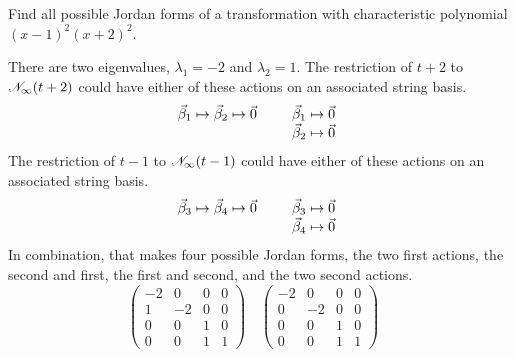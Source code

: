 \begin{exercises}
\begin{answer}
\begin{exparts}
\begin{equation*}
            \end{equation*}
      \end{exparts}  
    \end{answer}
  \recommended \item
    Find all possible Jordan forms of a transformation with characteristic
    polynomial \( (x-1)^2(x+2)^2  \).
    \begin{answer}
      There are two eigenvalues, $\lambda_1=-2$ and $\lambda_2=1$.
      The restriction of $t+2$ to 
      $\mathscr{N}_\infty(t+2)$ could have either of these actions 
      on an associated string basis.
      \begin{equation*}
        \vec{\beta}_1\mapsto\vec{\beta}_2\mapsto\vec{0}
        \qquad
        \begin{array}[t]{l}
          \vec{\beta}_1\mapsto\vec{0}  \\
          \vec{\beta}_2\mapsto\vec{0} 
        \end{array}
      \end{equation*}
      The restriction of $t-1$ to 
      $\mathscr{N}_\infty(t-1)$ could have either of these actions 
      on an associated string basis.
      \begin{equation*}
        \vec{\beta}_3\mapsto\vec{\beta}_4\mapsto\vec{0}
        \qquad
        \begin{array}[t]{l}
          \vec{\beta}_3\mapsto\vec{0}  \\
          \vec{\beta}_4\mapsto\vec{0} 
        \end{array}
      \end{equation*}
      In combination, that makes four possible Jordan forms,
      the two first actions, the second and first, the first and second, and
      the two second actions.
      \begin{equation*}
        \begin{pmatrix}
          -2  &0  &0  &0  \\
           1  &-2 &0  &0  \\
           0  &0  &1  &0  \\
           0  &0  &1  &1
        \end{pmatrix}
        \quad
        \begin{pmatrix}
          -2  &0  &0  &0  \\
           0  &-2 &0  &0  \\
           0  &0  &1  &0  \\
           0  &0  &1  &1
        \end{pmatrix}
        \quad

\end{equation*}
\end{answer}
\end{exercises}
